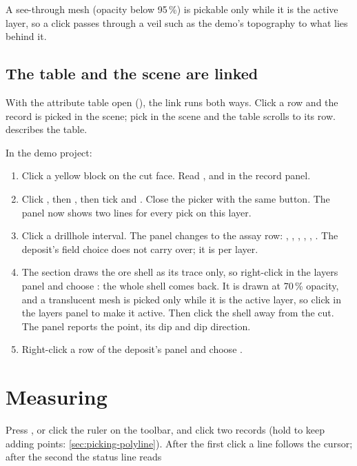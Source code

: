 A see-through mesh (opacity below 95\,\%) is pickable only while it is the active layer, so a click passes through a veil such as the demo's topography to what lies behind it.

\subsection{The table and the scene are linked}
With the attribute table open (), the link runs both ways. Click a row and the record is picked in the scene; pick in the scene and the table scrolls to its row.  describes the table.

\begin{tryit}
In the demo project:
\begin{enumerate}
\item Click a yellow block on the cut face. Read ,  and  in the record panel.
\item Click , then , then tick  and . Close the picker with the same button. The panel now shows two lines for every pick on this layer.
\item Click a drillhole interval. The panel changes to the assay row: , , , , , . The deposit's field choice does not carry over; it is per layer.
\item The section draws the ore shell as its trace only, so right-click  in the layers panel and choose : the whole shell comes back. It is drawn at 70\,\% opacity, and a translucent mesh is picked only while it is the active layer, so click  in the layers panel to make it active. Then click the shell away from the cut. The panel reports the point, its dip and dip direction.
\item Right-click a row of the deposit's panel and choose .
\end{enumerate}
\end{tryit}

\section{Measuring}\label{sec:picking-measure}
Press , or click the ruler on the toolbar, and click two records (hold  to keep adding points: \cref{sec:picking-polyline}). After the first click a line follows the cursor; after the second the status line reads

